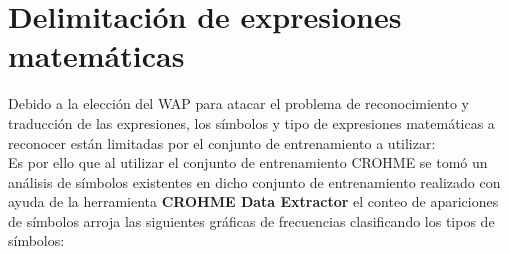 \newpage
\section{Delimitación de expresiones matemáticas}

Debido a la elección del WAP \cite{chino} para atacar el problema de reconocimiento y traducción de las expresiones, los símbolos y tipo de expresiones matemáticas a reconocer están limitadas por el conjunto de entrenamiento a utilizar:
\\
Es por ello que al utilizar el conjunto de entrenamiento CROHME \cite{CROHME}
se tomó un análisis de símbolos existentes en dicho conjunto de entrenamiento realizado con ayuda de la herramienta \textbf{CROHME Data Extractor} \cite{EXTRACTOR} el conteo de apariciones de símbolos arroja las siguientes gráficas de frecuencias clasificando los tipos de símbolos:\\

